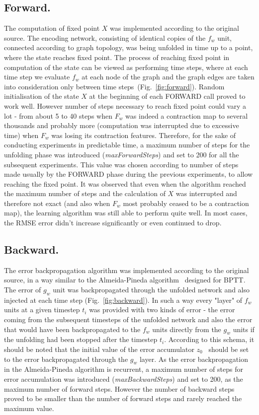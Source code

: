 \documentclass[a4paper, 11pt, twocolumn]{spie}  %
\begin{document}
\subsection{Forward.}
The computation of fixed point $X$ was implemented according to the original source. The encoding network, consisting of identical copies of the $f_w$ unit, connected according to graph topology, was being unfolded in time up to a point, where the state reaches fixed point. The process of reaching fixed point in computation of the state can be viewed as performing time steps, where at each time step we evaluate $f_w$ at each node of the graph and the graph edges are taken into consideration only between time steps~(Fig.~\ref{fig:forward}). Random initialisation of the state $X$ at the beginning of each FORWARD call proved to work well. However number of steps necessary to reach fixed point could vary a lot - from about 5 to 40 steps when $F_w$ was indeed a contraction map to several thousands and probably more (computation was interrupted due to excessive time) when $F_w$ was losing its contraction features. Therefore, for the sake of conducting experiments in predictable time, a maximum number of steps for the unfolding phase was introduced (\emph{maxForwardSteps}) and set to 200 for all the subsequent experiments. This value was chosen according to number of steps made usually by the FORWARD phase during the previous experiments, to allow reaching the fixed point.
\newpage \noindent It was observed that even when the algorithm reached the maximum number of steps and the calculation of $X$ was interrupted and therefore not exact (and also when $F_w$ most probably ceased to be a contraction map), the learning algorithm was still able to perform quite well. In most cases, the RMSE error didn't increase significantly or even continued to drop.


\subsection{Backward.}
The error backpropagation algorithm was implemented according to the original source, in a way similar to the Almeida-Pineda algorithm~ designed for BPTT. The error of $g_w$ unit was backpropagated through the unfolded network and also injected at each time step (Fig.~\ref{fig:backward}). In such a way every "layer" of $f_w$ units at a given timestep $t_i$ was provided with two kinds of error - the error coming from the subsequent timesteps of the unfolded network and also the error that would have been backpropagated to the $f_w$ units directly from the $g_w$ units if the unfolding had been stopped after the timestep $t_i$. According to this schema, it should be noted that the initial value of the error accumulator $z_0$~ should be set to the error backpropagated through the $g_w$ layer. As the error backpropagation in the Almeida-Pineda algorithm is recurrent, a maximum number of steps for error accumulation was introduced (\emph{maxBackwardSteps}) and set to 200, as the maximum number of forward steps. However the number of backward steps proved to be smaller than the number of forward steps and rarely reached the maximum value.
\end{document}
